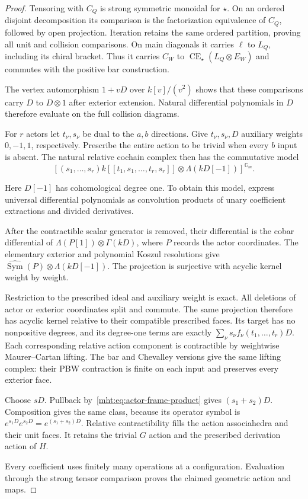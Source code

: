 \begin{proof}
Tensoring with $C_Q$ is strong symmetric monoidal
for $\star$. On an ordered disjoint decomposition
its comparison is the factorization equivalence
of $C_Q$, followed by open projection. Iteration
retains the same ordered partition, proving all
unit and collision comparisons. On main diagonals
it carries $\ell$ to $L_Q$, including its chiral
bracket. Thus it carries $C_W$ to
$\operatorname{CE}_\star(L_Q\otimes E_W)$ and
commutes with the positive bar construction.

The vertex automorphism $1+vD$ over $k[v]/(v^2)$
shows that these comparisons carry $D$ to
$D\otimes1$ after exterior extension. Natural
differential polynomials in $D$ therefore evaluate
on the full collision diagrams.

For $r$ actors let $t_\nu,s_\nu$ be dual to the
$a,b$ directions. Give $t_\nu,s_\nu,D$ auxiliary
weights $0,-1,1$, respectively. Prescribe the
entire action to be trivial when every $b$ input
is absent. The natural relative cochain complex
then has the commutative model
\[
 \left[(s_1,\ldots,s_r)
 k[[t_1,s_1,\ldots,t_r,s_r]]\otimes
                 \Lambda(kD[-1])\right]^{\mathbb G_m}.
\]

Here $D[-1]$ has cohomological degree one. To
obtain this model, express universal differential
polynomials as convolution products of unary
coefficient extractions and divided derivatives.

After the contractible scalar generator is removed,
their differential is the cobar differential of
$\Lambda(P[1])\otimes\Gamma(kD)$, where $P$
records the actor coordinates. The elementary
exterior and polynomial Koszul resolutions give
$\widehat{\operatorname{Sym}}(P)\otimes\Lambda(kD[-1])$.
The projection is surjective with acyclic kernel
weight by weight.

Restriction to the prescribed ideal and auxiliary
weight is exact. All deletions of actor or exterior
coordinates split and commute. The same projection
therefore has acyclic kernel relative to their
compatible prescribed faces. Its target has no
nonpositive degrees, and its degree-one terms are
exactly $\sum_\nu s_\nu f_\nu(t_1,\ldots,t_r)D$.
Each corresponding relative action component is
contractible by weightwise Maurer--Cartan lifting.
The bar and Chevalley versions give the same
lifting complex: their PBW contraction is finite
on each input and preserves every exterior face.

Choose $sD$. Pullback by~\eqref{mht:eq:actor-frame-product}
gives $(s_1+s_2)D$. Composition gives the same
class, because its operator symbol is
$e^{s_1D}e^{s_2D}=e^{(s_1+s_2)D}$.
Relative contractibility fills the action
associahedra and their unit faces. It retains the trivial
$G$ action and the prescribed derivation action of $H$. 

Every coefficient
uses finitely many operations at a configuration.
Evaluation through the strong tensor comparison
proves the claimed geometric action and maps.
\end{proof}

